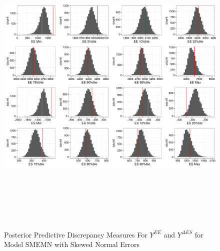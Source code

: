 \documentclass[11pt]{article}\usepackage[]{graphicx}\usepackage[]{color}
\begin{document}
  \begin{figure}
  \centering
  \includegraphics[width=17cm,height=15cm]{manual_figure/wpydiagbvn.pdf}
  \caption{Posterior Predictive Discrepancy Measures For $Y^{EE}$ and $Y^{\Delta ES}$ for Model SMEMN with Skewed Normal Errors}
  \label{wpydiagSMEMN}
  \end{figure}
  
\end{document}

